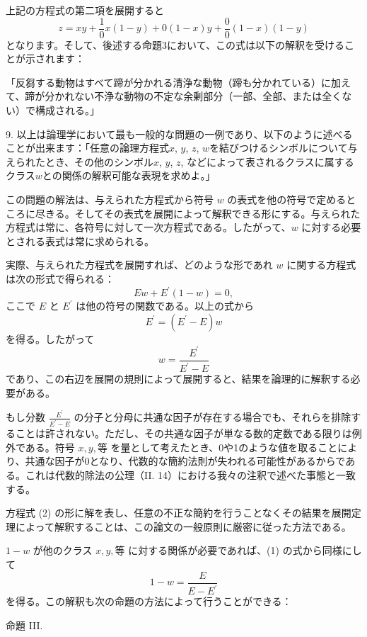 \documentclass[a4paper,11pt,openany]{ltjsbook}
\begin{document}
上記の方程式の第二項を展開すると
\[
z = xy + \frac{1}{0}x(1 - y) + 0(1 - x)y + \frac{0}{0}(1 - x)(1 - y)
\]
となります。そして、後述する命題3において、この式は以下の解釈を受けることが示されます：

「反芻する動物はすべて蹄が分かれる清浄な動物（蹄も分かれている）に加えて、蹄が分かれない不浄な動物の不定な余剰部分（一部、全部、または全くない）で構成される。」

9. 以上は論理学において最も一般的な問題の一例であり、以下のように述べることが出来ます：「任意の論理方程式$x$, $y$, $z$, $w$を結びつけるシンボルについて与えられたとき、その他のシンボル$x$, $y$, $z$, などによって表されるクラスに属するクラス$w$との関係の解釈可能な表現を求めよ。」

この問題の解法は、与えられた方程式から符号 \( w \) の表式を他の符号で定めるところに尽きる。そしてその表式を展開によって解釈できる形にする。与えられた方程式は常に、各符号に対して一次方程式である。したがって、\( w \) に対する必要とされる表式は常に求められる。

実際、与えられた方程式を展開すれば、どのような形であれ \( w \) に関する方程式は次の形式で得られる：
\begin{equation}
Ew + E^\prime(1-w) = 0,
\end{equation}
ここで \( E \) と \( E^\prime \) は他の符号の関数である。以上の式から
\[
E^\prime = (E^\prime - E)w
\]
を得る。したがって
\begin{equation}
w = \frac{E^\prime}{E^\prime-E}
\end{equation}
であり、この右辺を展開の規則によって展開すると、結果を論理的に解釈する必要がある。

もし分数 \(\frac{E^\prime}{E^\prime - E}\) の分子と分母に共通な因子が存在する場合でも、それらを排除することは許されない。ただし、その共通な因子が単なる数的定数である限りは例外である。符号 \( x, y, 等 \) を量として考えたとき、0や1のような値を取ることにより、共通な因子が0となり、代数的な簡約法則が失われる可能性があるからである。これは代数的除法の公理（II. 14）における我々の注釈で述べた事態と一致する。

方程式 (2) の形に解を表し、任意の不正な簡約を行うことなくその結果を展開定理によって解釈することは、この論文の一般原則に厳密に従った方法である。

\( 1 - w \) が他のクラス \( x, y, 等 \) に対する関係が必要であれば、(1) の式から同様にして
\[
1-w = \frac{E}{E-E^\prime}
\]
を得る。この解釈も次の命題の方法によって行うことができる：

\begin{center}
\textsc{命題 III.}
\end{center}
\end{document}

